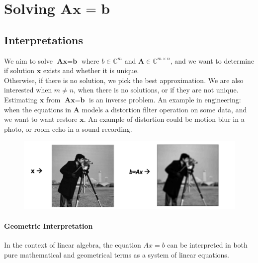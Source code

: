 \chapter{Solving $\textbf{Ax = b}$}
\section{Interpretations}

We aim to solve $\textbf{Ax} = \textbf{b}$ where $b \in \mathbb{C}^m$ and $\textbf{A} \in \mathbb{C}^{m\times n}$, and we want to determine if solution $\textbf{x}$ exists and whether it is unique. \\

Otherwise, if there is no solution, we pick the best approximation. We are also interested when $m\neq n $, when there is no solutions, or if they are not unique.\\

Estimating $\textbf{x}$ from $\textbf{Ax} = \textbf{b}$ is an inverse problem. An example in engineering: when the equations in $\textbf{A}$ models a distortion filter operation on some data, and we want to want restore $\textbf{x}$. An example of distortion could be motion blur in a photo, or room echo in a sound recording.\\

\begin{figure}[H]
    \centering
    \includegraphics[width=0.7\linewidth]{img/conv_blur.png}
    
    
\end{figure}

\subsubsection*{Geometric Interpretation}
In the context of linear algebra, the equation \(Ax = b\) can be interpreted in both pure mathematical and geometrical terms as a system of linear equations. 

